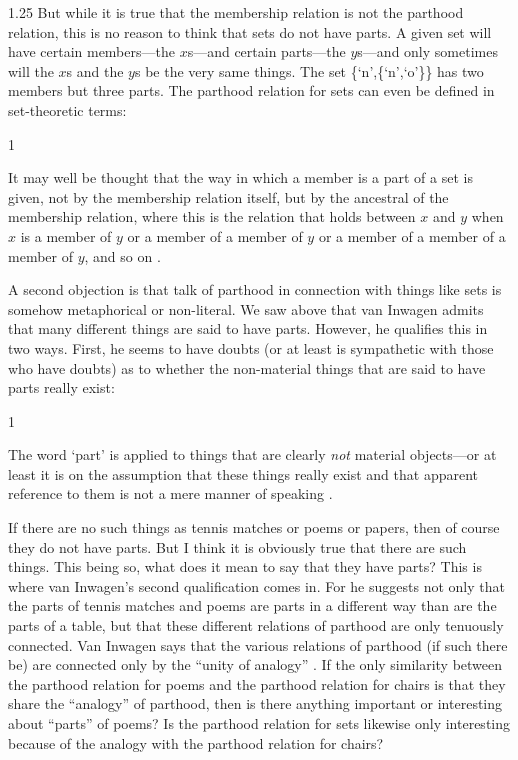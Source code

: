 \documentclass[12pt,twoside]{reedfancy}
\newenvironment{squote}{%
	\begin{spacing}{1}
	\begin{list}{}{%
	\setlength{\labelwidth}{0pt}%
	\rightmargin\leftmargin%
	}
	\item\relax
	}{%
	\end{list}%
	\end{spacing}
	}
\begin{document}
\begin{spacing}{1.25}
But while it is true that the membership relation is not the parthood
relation, this is no reason to think that sets do not have parts.  A
given set will have certain members---the $x$s---and certain
parts---the $y$s---and only sometimes will the $x$s and the $y$s be
the very same things.  The set \{`n',\{`n',`o'\}\} has two members
but three parts.  The parthood relation for sets can even be defined
in set-theoretic terms:

\begin{squote}
It may well be thought that the way in which a member is a part of a
set is given, not by the membership relation itself, but by the
ancestral of the membership relation, where this is the relation that
holds between $x$ and $y$ when $x$ is a member of $y$ or a member of a
member of $y$ or a member of a member of a member of $y$, and so on
\citep[563]{fine2010}.
\end{squote}

A second objection is that talk of parthood in connection with things
like sets is somehow metaphorical or non-literal.  We saw above that
van Inwagen admits that many different things are said to have parts.
However, he qualifies this in two ways.  First, he seems to have
doubts (or at least is sympathetic with those who have doubts) as to
whether the non-material things that are said to have parts really
exist:

\begin{squote}
The word `part' is applied to things that are clearly \emph{not}
material objects---or at least it is on the assumption that these
things really exist and that apparent reference to them is not a mere
manner of speaking \citep[19]{inwagen1995}.
\end{squote}

If there are no such things as tennis matches or poems or papers, then
of course they do not have parts.  But I think it is obviously true
that there are such things.  This being so, what does it mean to say
that they have parts?  This is where van Inwagen's second
qualification comes in.  For he suggests not only that the parts of
tennis matches and poems are parts in a different way than are the
parts of a table, but that these different relations of parthood are
only tenuously connected.  Van Inwagen says that the various relations
of parthood (if such there be) are connected only by the ``unity of
analogy'' \citeyearpar[19]{inwagen1995}.  If the only similarity
between the parthood relation for poems and the parthood relation for
chairs is that they share the ``analogy'' of parthood, then is there
anything important or interesting about ``parts'' of poems?  Is the
parthood relation for sets likewise only interesting because of the
analogy with the parthood relation for chairs?


\end{spacing}
\end{document}
